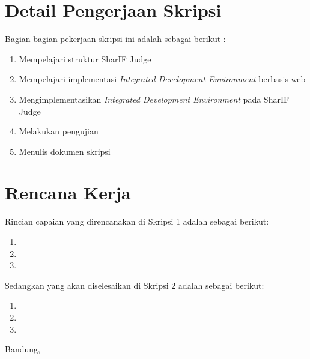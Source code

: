 \documentclass[a4paper,twoside]{article}
\begin{document}
\section{Detail Pengerjaan Skripsi}
Bagian-bagian pekerjaan skripsi ini adalah sebagai berikut :
\begin{enumerate}
	\item Mempelajari struktur SharIF Judge
	\item Mempelajari implementasi {\it Integrated Development Environment} berbasis web
	\item Mengimplementasikan {\it Integrated Development Environment} pada SharIF Judge
	\item Melakukan pengujian
	\item Menulis dokumen skripsi
\end{enumerate}

\section{Rencana Kerja}
Rincian capaian yang direncanakan di Skripsi 1 adalah sebagai berikut:
\begin{enumerate}
\item
\item
\item
\end{enumerate}

Sedangkan yang akan diselesaikan di Skripsi 2 adalah sebagai berikut:
\begin{enumerate}
\item
\item
\item
\end{enumerate}

\vspace{1cm}
\centering Bandung, \tanggal\\
\vspace{2cm} \nama \\ 
\vspace{1cm}
\end{document}
